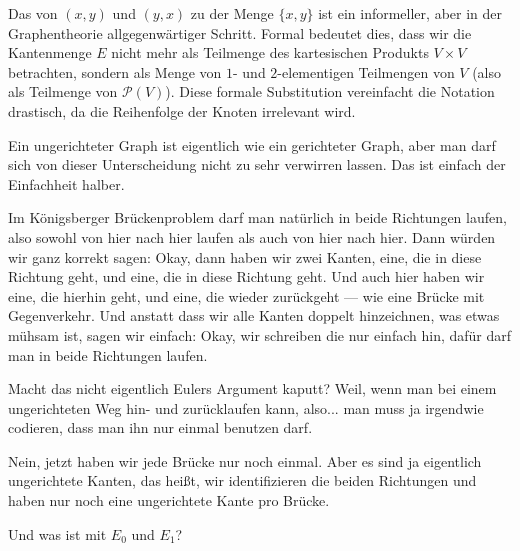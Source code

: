 \begin{didactic-insight}
Das  von $(x, y)$ und $(y, x)$ zu der Menge $\{x, y\}$ ist ein informeller, aber in der Graphentheorie allgegenwärtiger Schritt. Formal bedeutet dies, dass wir die Kantenmenge $E$ nicht mehr als Teilmenge des kartesischen Produkts $V \times V$ betrachten, sondern als Menge von $1$- und $2$-elementigen Teilmengen von $V$ (also als Teilmenge von $\mathcal{P}(V)$). Diese formale Substitution vereinfacht die Notation drastisch, da die Reihenfolge der Knoten irrelevant wird.
\end{didactic-insight}

\begin{spoken-clean}[00:17:26 - 00:20:32]
Ein ungerichteter Graph ist eigentlich wie ein gerichteter Graph, aber man darf sich von dieser Unterscheidung nicht zu sehr verwirren lassen. Das ist einfach der Einfachheit halber.

Im Königsberger Brückenproblem darf man natürlich in beide Richtungen laufen, also sowohl von hier nach hier laufen als auch von hier nach hier. Dann würden wir ganz korrekt sagen: Okay, dann haben wir zwei Kanten, eine, die in diese Richtung geht, und eine, die in diese Richtung geht. Und auch hier haben wir eine, die hierhin geht, und eine, die wieder zurückgeht --- wie eine Brücke mit Gegenverkehr. Und anstatt dass wir alle Kanten doppelt hinzeichnen, was etwas mühsam ist, sagen wir einfach: Okay, wir schreiben die nur einfach hin, dafür darf man in beide Richtungen laufen.
\end{spoken-clean}

\begin{student-interaction}[Studentenfrage]
Macht das nicht eigentlich Eulers Argument kaputt? Weil, wenn man bei einem ungerichteten Weg hin- und zurücklaufen kann, also... man muss ja irgendwie codieren, dass man ihn nur einmal benutzen darf.
\end{student-interaction}

\begin{spoken-clean}[00:20:32 - 00:21:12]
Nein, jetzt haben wir jede Brücke nur noch einmal. Aber es sind ja eigentlich ungerichtete Kanten, das heißt, wir identifizieren die beiden Richtungen und haben nur noch eine ungerichtete Kante pro Brücke.
\end{spoken-clean}

\begin{student-interaction}[Studentenfrage]
Und was ist mit $E_0$ und $E_1$?
\end{student-interaction}

